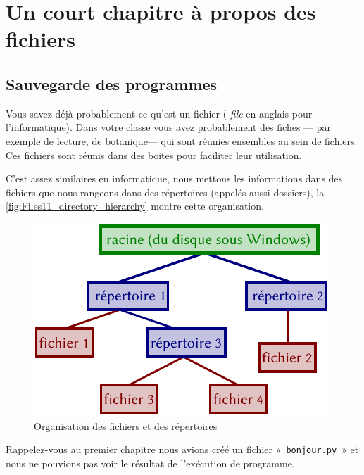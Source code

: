 



\chapter{Un court chapitre à propos des fichiers}\label{ch:ashortchapteraboutfiles}
\section{Sauvegarde des programmes}

Vous savez déjà probablement ce qu'est un fichier ( \emph{file} en anglais pour l'informatique).
Dans votre classe vous avez probablement des fiches --- par exemple de lecture, de botanique--- qui sont réunies ensembles au sein de fichiers. Ces fichiers sont réunis dans des boites pour faciliter leur utilisation.

C'est assez similaires en informatique, nous mettons les informations dans des fichiers que nous rangeons dans des répertoires (appelés aussi dossiers), la \autoref{fig:Files11_directory_hierarchy} montre cette organisation.

\begin{figure}[h!]
\centering
\includegraphics[scale=1]{images/Files11_directory_hierarchy.pdf}
\caption{Organisation des fichiers et des répertoires}\label{fig:Files11_directory_hierarchy}
\end{figure}


Rappelez-vous au premier chapitre nous avions créé un fichier « \texttt{bonjour.py} » et nous ne pouvions pas voir le résultat de l'exécution de programme.

